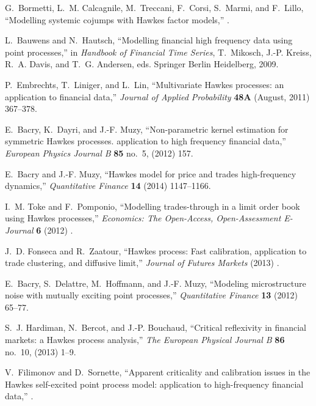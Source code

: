 \documentclass{article}
\newcommand{\tmtextbf}[1]{{\bfseries{#1}}}
\newcommand{\tmtextit}[1]{{\itshape{#1}}}
\newcommand{\tmtexttt}[1]{{\ttfamily{#1}}}
\begin{document}
\begin{thebibliography}{10}
  G.~Bormetti, L.~M. Calcagnile, M.~Treccani, F.~Corsi,
  S.~Marmi, and F.~Lillo, ``Modelling systemic cojumps with Hawkes factor
  models,'' \href{http://arxiv.org/abs/1301.6141}{\tmtexttt{arXiv:1301.6141
  [q-fin.ST]}}.
  
  L.~Bauwens and N.~Hautsch, ``Modelling financial high
  frequency data using point processes,'' in \tmtextit{Handbook of Financial
  Time Series}, T.~Mikosch, J.-P. Kreiss, R.~A. Davis, and T.~G. Andersen,
  eds. {\newblock}Springer Berlin Heidelberg, 2009.
  
  P.~Embrechts, T.~Liniger, and L.~Lin,
  ``Multivariate Hawkes processes: an application to financial data,''
  \tmtextit{Journal of Applied Probability} \tmtextbf{48A} (August, 2011)
  367--378.
  
  E.~Bacry, K.~Dayri, and J.-F. Muzy, ``Non-parametric
  kernel estimation for symmetric Hawkes processes. application to high
  frequency financial data,'' \tmtextit{European Physics Journal B}
  \tmtextbf{85} no.~5, (2012) 157.
  
  E.~Bacry and J.-F. Muzy, ``Hawkes model for
  price and trades high-frequency dynamics,'' \tmtextit{Quantitative Finance}
  \tmtextbf{14} (2014) 1147--1166.
  
  I.~M. Toke and F.~Pomponio, ``Modelling trades-through in
  a limit order book using Hawkes processes,'' \tmtextit{Economics: The
  Open-Access, Open-Assessment E-Journal} \tmtextbf{6} (2012) .
  
  J.~D. Fonseca and R.~Zaatour, ``Hawkes process: Fast
  calibration, application to trade clustering, and diffusive limit,''
  \tmtextit{Journal of Futures Markets} (2013) .
  
  E.~Bacry, S.~Delattre, M.~Hoffmann, and
  J.-F. Muzy, ``Modeling microstructure noise with mutually exciting point
  processes,'' \tmtextit{Quantitative Finance} \tmtextbf{13} (2012) 65--77.
  
  S.~J. Hardiman, N.~Bercot, and J.-P.
  Bouchaud, ``Critical reflexivity in financial markets: a Hawkes process
  analysis,'' \tmtextit{The European Physical Journal B} \tmtextbf{86} no.~10,
  (2013) 1--9.
  
  V.~Filimonov and D.~Sornette, ``Apparent
  criticality and calibration issues in the Hawkes self-excited point process
  model: application to high-frequency financial data,''
  \href{http://arxiv.org/abs/1308.6756}{\tmtexttt{arXiv:1308.6756
  [q-fin.ST]}}.
  

\end{thebibliography}
\end{document}
